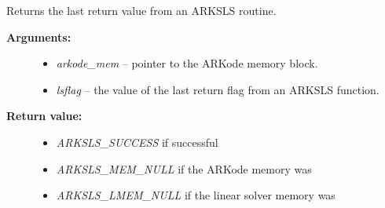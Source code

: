 \documentclass[letterpaper,10pt,english]{sphinxmanual}
\begin{document}
\begin{fulllineitems}
\label{c_interface/User_callable:c.ARKSlsGetLastFlag}
Returns the last return value from an ARKSLS routine.
\begin{description}
\item[{\textbf{Arguments:}}] \leavevmode\begin{itemize}
\item {} 
\emph{arkode\_mem} -- pointer to the ARKode memory block.

\item {} 
\emph{lsflag} -- the value of the last return flag from an ARKSLS function.

\end{itemize}

\item[{\textbf{Return value:}}] \leavevmode\begin{itemize}
\item {} 
\emph{ARKSLS\_SUCCESS} if successful

\item {} 
\emph{ARKSLS\_MEM\_NULL} if the ARKode memory was 

\item {} 
\emph{ARKSLS\_LMEM\_NULL} if the linear solver memory was 

\end{itemize}

\end{description}

\end{fulllineitems}

\end{document}
